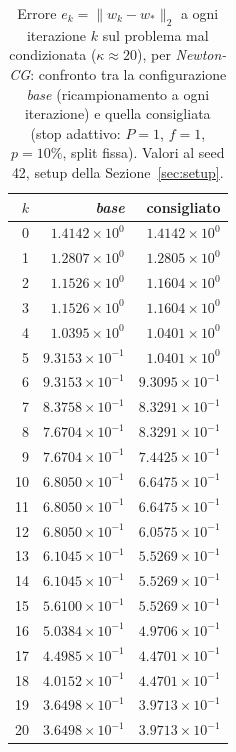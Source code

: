 \begin{table}[H]
\centering
\footnotesize
\renewcommand{\arraystretch}{0.85}
\setlength{\tabcolsep}{8pt}
\caption{Errore $e_k=\|w_k-w_*\|_2$ a ogni iterazione $k$ sul problema mal condizionata ($\kappa\approx 20$), per \emph{Newton-CG}: confronto tra la configurazione \emph{base} (ricampionamento a ogni iterazione) e quella consigliata (stop adattivo: $P{=}1$, $f{=}1$, $p{=}10\%$, split fissa). Valori al seed 42, setup della Sezione~\ref{sec:setup}.}
\label{tab:riuso_cons_malcond_ncg}
\begin{tabular}{@{}rrr@{}}
\toprule
$k$ & \emph{base} & consigliato\\
\midrule
0 & $1.4142\times10^{0}$ & $1.4142\times10^{0}$\\
1 & $1.2807\times10^{0}$ & $1.2805\times10^{0}$\\
2 & $1.1526\times10^{0}$ & $1.1604\times10^{0}$\\
3 & $1.1526\times10^{0}$ & $1.1604\times10^{0}$\\
4 & $1.0395\times10^{0}$ & $1.0401\times10^{0}$\\
5 & $9.3153\times10^{-1}$ & $1.0401\times10^{0}$\\
6 & $9.3153\times10^{-1}$ & $9.3095\times10^{-1}$\\
7 & $8.3758\times10^{-1}$ & $8.3291\times10^{-1}$\\
8 & $7.6704\times10^{-1}$ & $8.3291\times10^{-1}$\\
9 & $7.6704\times10^{-1}$ & $7.4425\times10^{-1}$\\
10 & $6.8050\times10^{-1}$ & $6.6475\times10^{-1}$\\
11 & $6.8050\times10^{-1}$ & $6.6475\times10^{-1}$\\
12 & $6.8050\times10^{-1}$ & $6.0575\times10^{-1}$\\
13 & $6.1045\times10^{-1}$ & $5.5269\times10^{-1}$\\
14 & $6.1045\times10^{-1}$ & $5.5269\times10^{-1}$\\
15 & $5.6100\times10^{-1}$ & $5.5269\times10^{-1}$\\
16 & $5.0384\times10^{-1}$ & $4.9706\times10^{-1}$\\
17 & $4.4985\times10^{-1}$ & $4.4701\times10^{-1}$\\
18 & $4.0152\times10^{-1}$ & $4.4701\times10^{-1}$\\
19 & $3.6498\times10^{-1}$ & $3.9713\times10^{-1}$\\
20 & $3.6498\times10^{-1}$ & $3.9713\times10^{-1}$\\

\end{tabular}
\end{table}
